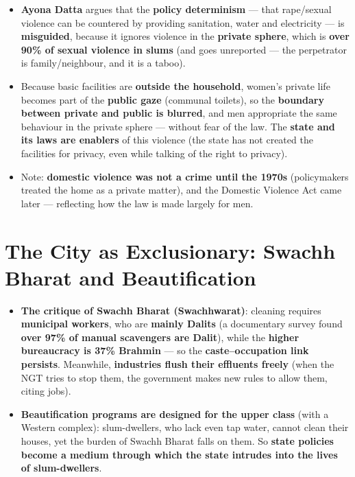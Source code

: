 \begin{KeyConcept}
\begin{itemize}
\item \textbf{Ayona Datta} argues that the \textbf{policy determinism} --- that rape/sexual violence can be countered by providing sanitation, water and electricity --- is \textbf{misguided}, because it ignores violence in the \textbf{private sphere}, which is \textbf{over 90\% of sexual violence in slums} (and goes unreported --- the perpetrator is family/neighbour, and it is a taboo).
\item Because basic facilities are \textbf{outside the household}, women's private life becomes part of the \textbf{public gaze} (communal toilets), so the \textbf{boundary between private and public is blurred}, and men appropriate the same behaviour in the private sphere --- without fear of the law. The \textbf{state and its laws are enablers} of this violence (the state has not created the facilities for privacy, even while talking of the right to privacy).
\item Note: \textbf{domestic violence was not a crime until the 1970s} (policymakers treated the home as a private matter), and the Domestic Violence Act came later --- reflecting how the law is made largely for men.
\end{itemize}
\end{KeyConcept}

\section{The City as Exclusionary: Swachh Bharat and Beautification}

\begin{CriticalPoint}
\begin{itemize}
\item \textbf{The critique of Swachh Bharat (Swachhwarat)}: cleaning requires \textbf{municipal workers}, who are \textbf{mainly Dalits} (a documentary survey found \textbf{over 97\% of manual scavengers are Dalit}), while the \textbf{higher bureaucracy is 37\% Brahmin} --- so the \textbf{caste--occupation link persists}. Meanwhile, \textbf{industries flush their effluents freely} (when the NGT tries to stop them, the government makes new rules to allow them, citing jobs).
\item \textbf{Beautification programs are designed for the upper class} (with a Western complex): slum-dwellers, who lack even tap water, cannot clean their houses, yet the burden of Swachh Bharat falls on them. So \textbf{state policies become a medium through which the state intrudes into the lives of slum-dwellers}.
\end{itemize}
\end{CriticalPoint}

